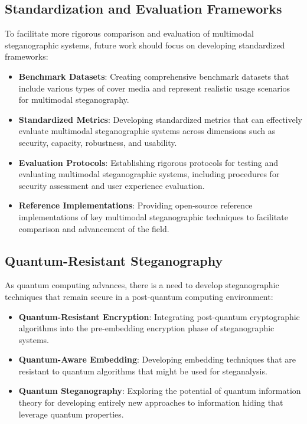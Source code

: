 \documentclass[12pt, a4paper, oneside]{book}
\begin{document}
\subsection{Standardization and Evaluation Frameworks}

To facilitate more rigorous comparison and evaluation of multimodal steganographic systems, future work should focus on developing standardized frameworks:

\begin{itemize}[leftmargin=*]
    \item \textbf{Benchmark Datasets}: Creating comprehensive benchmark datasets that include various types of cover media and represent realistic usage scenarios for multimodal steganography.

    \item \textbf{Standardized Metrics}: Developing standardized metrics that can effectively evaluate multimodal steganographic systems across dimensions such as security, capacity, robustness, and usability.

    \item \textbf{Evaluation Protocols}: Establishing rigorous protocols for testing and evaluating multimodal steganographic systems, including procedures for security assessment and user experience evaluation.

    \item \textbf{Reference Implementations}: Providing open-source reference implementations of key multimodal steganographic techniques to facilitate comparison and advancement of the field.
\end{itemize}

\subsection{Quantum-Resistant Steganography}

As quantum computing advances, there is a need to develop steganographic techniques that remain secure in a post-quantum computing environment:

\begin{itemize}[leftmargin=*]
    \item \textbf{Quantum-Resistant Encryption}: Integrating post-quantum cryptographic algorithms into the pre-embedding encryption phase of steganographic systems.

    \item \textbf{Quantum-Aware Embedding}: Developing embedding techniques that are resistant to quantum algorithms that might be used for steganalysis.

    \item \textbf{Quantum Steganography}: Exploring the potential of quantum information theory for developing entirely new approaches to information hiding that leverage quantum properties.
\end{itemize}
\end{document}
